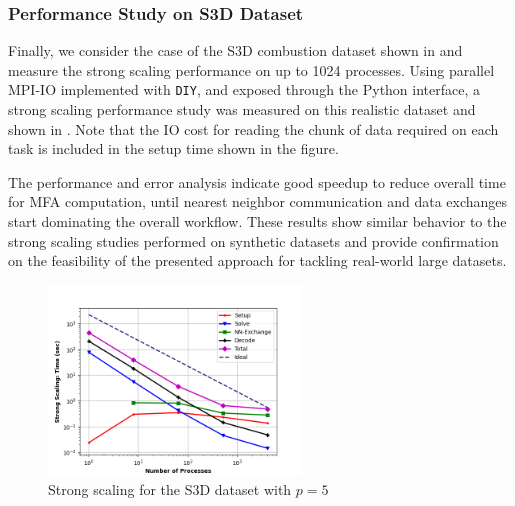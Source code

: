 \subsubsection*{Performance Study on S3D Dataset}

Finally, we consider the case of the S3D combustion dataset shown in  and measure the strong scaling performance on up to 1024 processes. Using parallel MPI-IO implemented with \texttt{DIY}, and exposed through the Python interface, a strong scaling performance study was measured on this realistic dataset and shown in . Note that the IO cost for reading the chunk of data required on each task is included in the setup time shown in the figure.

The performance and error analysis indicate good speedup to reduce overall time for MFA computation, until nearest neighbor communication and data exchanges start dominating the overall workflow. These results show similar behavior to the strong scaling studies performed on synthetic datasets and provide confirmation on the feasibility of the presented approach for tackling real-world large datasets.

\begin{figure}[htbp]
	\centering
	\includegraphics[width=0.6\textwidth]{figures/problem-s3d-strong-scaling.png}
	\caption{Strong scaling for the S3D dataset with $p=5$}
	\label{fig:s3d-strong-scaling}
\end{figure}




